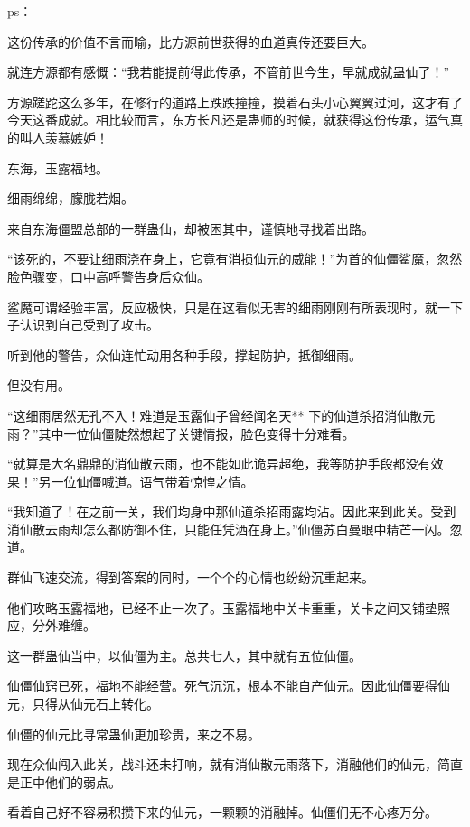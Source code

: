 
\begin{this_body}

ps：

这份传承的价值不言而喻，比方源前世获得的血道真传还要巨大。

就连方源都有感慨：“我若能提前得此传承，不管前世今生，早就成就蛊仙了！”

方源蹉跎这么多年，在修行的道路上跌跌撞撞，摸着石头小心翼翼过河，这才有了今天这番成就。相比较而言，东方长凡还是蛊师的时候，就获得这份传承，运气真的叫人羡慕嫉妒！

东海，玉露福地。

细雨绵绵，朦胧若烟。

来自东海僵盟总部的一群蛊仙，却被困其中，谨慎地寻找着出路。

“该死的，不要让细雨浇在身上，它竟有消损仙元的威能！”为首的仙僵鲨魔，忽然脸色骤变，口中高呼警告身后众仙。

鲨魔可谓经验丰富，反应极快，只是在这看似无害的细雨刚刚有所表现时，就一下子认识到自己受到了攻击。

听到他的警告，众仙连忙动用各种手段，撑起防护，抵御细雨。

但没有用。

“这细雨居然无孔不入！难道是玉露仙子曾经闻名天** 下的仙道杀招消仙散元雨？”其中一位仙僵陡然想起了关键情报，脸色变得十分难看。

“就算是大名鼎鼎的消仙散云雨，也不能如此诡异超绝，我等防护手段都没有效果！”另一位仙僵喊道。语气带着惊惶之情。

“我知道了！在之前一关，我们均身中那仙道杀招雨露均沾。因此来到此关。受到消仙散云雨却怎么都防御不住，只能任凭洒在身上。”仙僵苏白曼眼中精芒一闪。忽道。

群仙飞速交流，得到答案的同时，一个个的心情也纷纷沉重起来。

他们攻略玉露福地，已经不止一次了。玉露福地中关卡重重，关卡之间又铺垫照应，分外难缠。

这一群蛊仙当中，以仙僵为主。总共七人，其中就有五位仙僵。

仙僵仙窍已死，福地不能经营。死气沉沉，根本不能自产仙元。因此仙僵要得仙元，只得从仙元石上转化。

仙僵的仙元比寻常蛊仙更加珍贵，来之不易。

现在众仙闯入此关，战斗还未打响，就有消仙散元雨落下，消融他们的仙元，简直是正中他们的弱点。

看着自己好不容易积攒下来的仙元，一颗颗的消融掉。仙僵们无不心疼万分。


\end{this_body}
